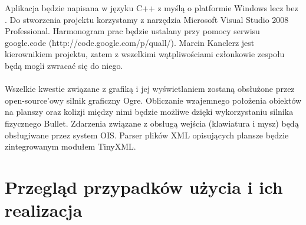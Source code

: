 \documentclass[12pt,a4paper,twoside]{article}
\begin{document}
Aplikacja będzie napisana w języku C++ z myślą o platformie Windows lecz bez . Do stworzenia projektu korzystamy z narzędzia Microsoft Visual Studio 2008 Professional. Harmonogram prac będzie ustalany przy pomocy serwisu google.code (http://code.google.com/p/quall/). Marcin Kanclerz jest kierownikiem projektu, zatem z wszelkimi wątpliwościami członkowie zespołu będą mogli zwracać się do niego.\\
\\
Wszelkie kwestie związane z grafiką i jej wyświetlaniem zostaną obsłużone przez open-source'owy silnik graficzny Ogre. Obliczanie wzajemnego położenia obiektów na planszy oraz kolizji między nimi będzie możliwe dzięki wykorzystaniu silnika fizycznego Bullet. Zdarzenia związane z obsługą wejścia (klawiatura i mysz) będą obsługiwane przez system OIS. Parser plików XML opisujących plansze będzie zintegrowanym modułem TinyXML.

\section{Przegląd przypadków użycia i ich realizacja}

\end{document}
